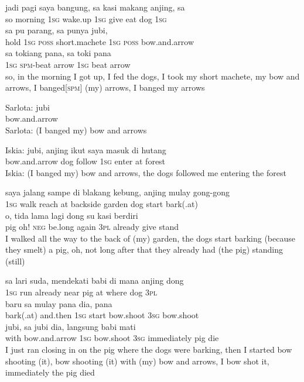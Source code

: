 \ea
\gll   jadi    {pagi}    {saya}    {bangung,}    {sa}    {kasi}    {makang}   anjing,   sa\\
  so    {morning}    {\textsc{1sg}}    {wake.up}    {\textsc{1sg}}    {give}    {eat}   dog   \textsc{1sg}\\
   sa    {pu}    {parang,}    {sa}    {punya}    {jubi,}\\
   {hold}   \textsc{1sg}    {\textsc{poss}}    {short.machete}    {\textsc{1sg}}    {\textsc{poss}}    {bow.and.arrow}\\
\gll sa    {tokiang}    {pana,}   sa    {toki}    {pana}\\
  \textsc{1sg}    {\textsc{spm}{}-beat}    {arrow}   \textsc{1sg}    {beat}    {arrow}\\
\glt
so, in the morning I got up, I fed the dogs, I took my short machete, my bow and arrows, I banged[\textsc{spm}] (my) arrows, I banged my arrows
\z

\ea
\gll   Sarlota:   jubi\\
  {} bow.and.arrow\\
\glt
Sarlota: (I banged my) bow and arrows
\z

\ea
\gll   Iskia:   jubi,   anjing   ikut   saya   masuk   di   hutang\\
{} bow.and.arrow   dog   follow   \textsc{1sg}   enter   at   forest\\
\glt
Iskia: (I banged my) bow and arrows, the dogs followed me entering the forest
\z

\ea
\gll   saya    {jalang}    {sampe}   di    {blakang}    {kebung,}    {anjing}    {mulay}   gong-gong\\
  \textsc{1sg}    {walk}    {reach}   at    {backside}    {garden}    {dog}    {start}   bark(.at)\\
   o,    {tida}    {lama}   lagi    {dong}    {su}    {kasi}    {berdiri}\\
   {pig}   oh!    {\textsc{neg}}    {be.long}   again    {\textsc{3pl}}    {already}    {give}    {stand}\\
\glt
I walked all the way to the back of (my) garden, the dogs start barking (because they smelt) a pig, oh, not long after that they already had (the pig) standing (still)
\z

\ea
\gll   sa    {lari}    {suda,}    {mendekati}    {babi}    {di}    {mana}    {anjing}    {dong}\\
  \textsc{1sg}    {run}    {already}    {near}    {pig}    {at}    {where}    {dog}    {\textsc{3pl}}\\
    {baru}   sa    {mulay}    {pana}    {dia,}    {pana}\\
   {bark(.at)}    {and.then}   \textsc{1sg}    {start}    {bow.shoot}    {\textsc{3sg}}    {bow.shoot}\\
    {jubi,}   sa    {jubi}    {dia,}    {langsung}   babi   mati\\
   {with}    {bow.and.arrow}   \textsc{1sg}    {bow.shoot}    {\textsc{3sg}}    {immediately}   pig   die\\
\glt
I just ran closing in on the pig where the dogs were barking, then I started bow shooting (it), bow shooting (it) with (my) bow and arrows, I bow shot it, immediately the pig died
\z

